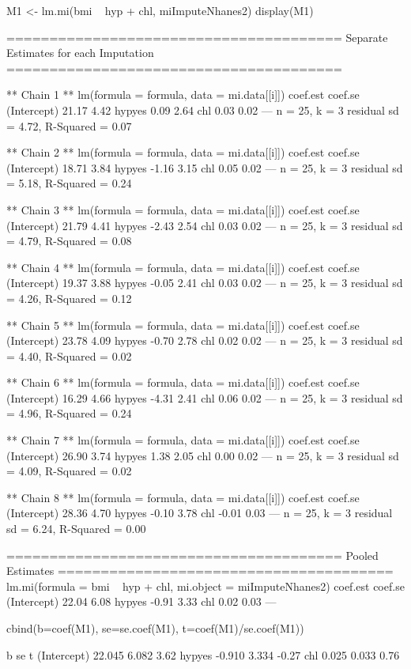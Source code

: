 \begin{Schunk}
\begin{Sinput}
 M1 <- lm.mi(bmi ~ hyp + chl, miImputeNhanes2)
 display(M1)
\end{Sinput}
\begin{Soutput}
=======================================
Separate Estimates for each Imputation
=======================================

** Chain 1 **
lm(formula = formula, data = mi.data[[i]])
            coef.est coef.se
(Intercept) 21.17     4.42  
hypyes       0.09     2.64  
chl          0.03     0.02  
---
n = 25, k = 3
residual sd = 4.72, R-Squared = 0.07

** Chain 2 **
lm(formula = formula, data = mi.data[[i]])
            coef.est coef.se
(Intercept) 18.71     3.84  
hypyes      -1.16     3.15  
chl          0.05     0.02  
---
n = 25, k = 3
residual sd = 5.18, R-Squared = 0.24

** Chain 3 **
lm(formula = formula, data = mi.data[[i]])
            coef.est coef.se
(Intercept) 21.79     4.41  
hypyes      -2.43     2.54  
chl          0.03     0.02  
---
n = 25, k = 3
residual sd = 4.79, R-Squared = 0.08

** Chain 4 **
lm(formula = formula, data = mi.data[[i]])
            coef.est coef.se
(Intercept) 19.37     3.88  
hypyes      -0.05     2.41  
chl          0.03     0.02  
---
n = 25, k = 3
residual sd = 4.26, R-Squared = 0.12

** Chain 5 **
lm(formula = formula, data = mi.data[[i]])
            coef.est coef.se
(Intercept) 23.78     4.09  
hypyes      -0.70     2.78  
chl          0.02     0.02  
---
n = 25, k = 3
residual sd = 4.40, R-Squared = 0.02

** Chain 6 **
lm(formula = formula, data = mi.data[[i]])
            coef.est coef.se
(Intercept) 16.29     4.66  
hypyes      -4.31     2.41  
chl          0.06     0.02  
---
n = 25, k = 3
residual sd = 4.96, R-Squared = 0.24

** Chain 7 **
lm(formula = formula, data = mi.data[[i]])
            coef.est coef.se
(Intercept) 26.90     3.74  
hypyes       1.38     2.05  
chl          0.00     0.02  
---
n = 25, k = 3
residual sd = 4.09, R-Squared = 0.02

** Chain 8 **
lm(formula = formula, data = mi.data[[i]])
            coef.est coef.se
(Intercept) 28.36     4.70  
hypyes      -0.10     3.78  
chl         -0.01     0.03  
---
n = 25, k = 3
residual sd = 6.24, R-Squared = 0.00

=======================================
Pooled Estimates
=======================================
lm.mi(formula = bmi ~ hyp + chl, mi.object = miImputeNhanes2)
            coef.est coef.se
(Intercept) 22.04     6.08  
hypyes      -0.91     3.33  
chl          0.02     0.03  
---
\end{Soutput}
\begin{Sinput}
 cbind(b=coef(M1), se=se.coef(M1), t=coef(M1)/se.coef(M1))
\end{Sinput}
\begin{Soutput}
                 b    se     t
(Intercept) 22.045 6.082  3.62
hypyes      -0.910 3.334 -0.27
chl          0.025 0.033  0.76
\end{Soutput}
\end{Schunk}
